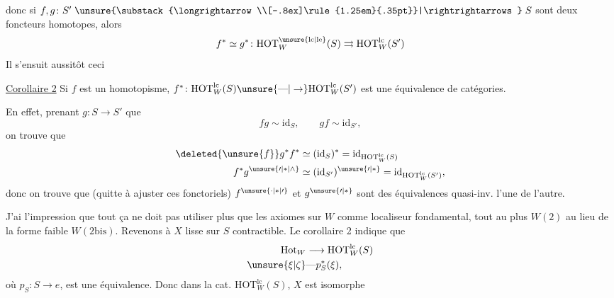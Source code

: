 
donc si $f,g\colon S'\mathrel{\unsure{\substack{\longrightarrow\\[-.8ex]\rule{1.25em}{.35pt}}|\rightrightarrows}}S$ sont deux foncteurs homotopes, alors
\[ f^*\simeq g^*\colon \mathrm{HOT}^{\unsure{\mathrm{lc}|\mathrm{le}}}_W(S)\rightrightarrows\mathrm{HOT}^{\mathrm{lc}}_W(S') \]
Il s'ensuit aussitôt ceci

\uline{Corollaire 2} Si $f$ est un homotopisme, $f^*\colon\mathrm{HOT}^{\mathrm{lc}}_W(S)\unsure{\text{---}|\to}\mathrm{HOT}^{\mathrm{lc}}_W(S')$ est une équivalence de catégories.

En effet, prenant $g\colon S\longrightarrow S'$  que
\[ fg\sim\mathrm{id}_S,\qquad gf\sim\mathrm{id}_{S'}, \]
on trouve que
\[ \begin{aligned}\deleted{\unsure{f}}g^*f^*&\simeq(\mathrm{id}_S)^*=\mathrm{id}_{\mathrm{HOT}^{\mathrm{lc}}_W(S)}\\
f^*g^{\unsure{\prime|*|\wedge}}&\simeq(\mathrm{id}_{S'})^{\unsure{\prime|*}}=\mathrm{id}_{\mathrm{HOT}^{\mathrm{lc}}_W(S')},\end{aligned} \]
donc on trouve que (quitte à ajuster ces  fonctoriels) $f^{\unsure{\cdot|*|\prime}}$ et $g^{\unsure{\prime|*}}$ sont des équivalences quasi-inv. l'une de l'autre.

J'ai l'impression que tout ça ne doit pas utiliser plus que les axiomes  sur $W$ comme localiseur fondamental, tout au plus $W(2)$ au lieu de la forme faible $W(2\mathrm{bis})$.
Revenons à $X$ lisse sur $S$ contractible. Le corollaire 2 indique que
\[ \begin{aligned}\mathrm{Hot}_W&\longrightarrow\mathrm{HOT}^{\mathrm{lc}}_W(S)\\
\unsure{\xi|\zeta}&\text{---}p_S^*(\xi),\end{aligned} \]
où $p_S\colon S\longrightarrow e$, est une équivalence. Donc dans la cat. $\mathrm{HOT}^{\mathrm{lc}}_W(S)$, $X$ est isomorphe

